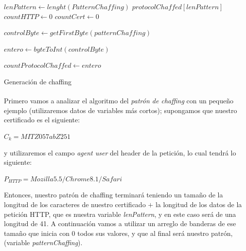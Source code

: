 \documentclass[12pt, a4paper, titlepage]{report}
\begin{document}
                \newpage
                
                \begin{algorithm}[H]
                    \SetAlgoLined
                    
                    $lenPattern \longleftarrow lenght(PatternChaffing)$\;
                    $protocolChaffed[lenPattern]$
                    $countHTTP \longleftarrow 0$\;
                    $countCert \longleftarrow 0$\;
                    
                    $controlByte \longleftarrow getFirstByte(patternChaffing)$\;
                    
                    $entero \longleftarrow byteToInt(controlByte)$\;
                    
                    $countProtocolChaffed \longleftarrow entero$\;
                    
                   
                    \caption{Generación de chaffing}
                \end{algorithm}
                
    		   \paragraph{}
    		   Primero vamos a analizar el algoritmo del \textit{patrón de chaffing} con un pequeño ejemplo (utilizaremos datos de variables más cortos); supongamos que nuestro certificado es el siguiente: 
    		    \begin{center}
    		        $C_k = MITZ057abZ251$
    		    \end{center}
    		    y utilizaremos el campo \textit{agent user} del header de la petición, lo cual tendrá lo siguiente:
    		    \begin{center}
    		        $P_{HTTP} = Mozilla5.5/Chrome8.1/Safari$
    		    \end{center}
    		    Entonces, nuestro patrón de chaffing terminará teniendo un tamaño de la longitud de los caracteres de nuestro certificado $+$ la longitud de los datos de la petición HTTP, que es nuestra variable \textit{lenPattern}, y en este caso será de una longitud de 41. A continuación vamos a utilizar un arreglo de banderas de ese tamaño que inicia con 0 todos sus valores, y que al final será nuestro patrón, (variable \textit{patternChaffing}).\\
    		    
\end{document}
